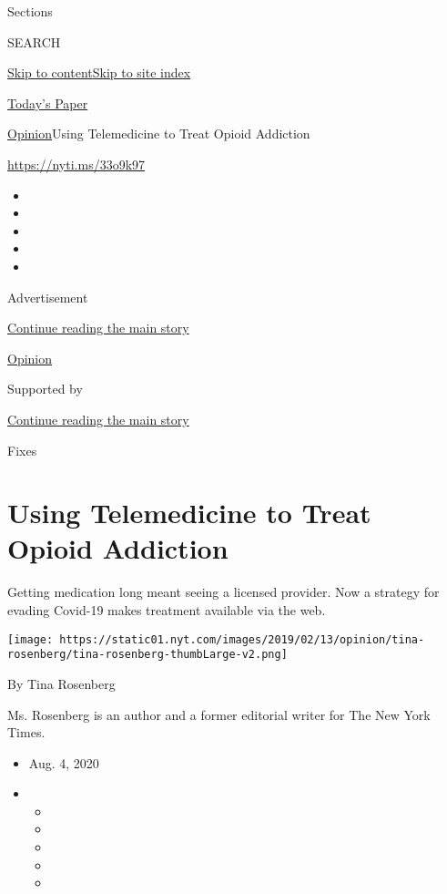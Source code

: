 Sections

SEARCH

\protect\hyperlink{site-content}{Skip to
content}\protect\hyperlink{site-index}{Skip to site index}

\href{https://myaccount.nytimes.com/auth/login?response_type=cookie\&client_id=vi}{}

\href{https://www.nytimes.com/section/todayspaper}{Today's Paper}

\href{/section/opinion}{Opinion}\textbar{}Using Telemedicine to Treat
Opioid Addiction

\url{https://nyti.ms/33o9k97}

\begin{itemize}
\item
\item
\item
\item
\item
\end{itemize}

Advertisement

\protect\hyperlink{after-top}{Continue reading the main story}

\href{/section/opinion}{Opinion}

Supported by

\protect\hyperlink{after-sponsor}{Continue reading the main story}

Fixes

\hypertarget{using-telemedicine-to-treat-opioid-addiction}{%
\section{Using Telemedicine to Treat Opioid
Addiction}\label{using-telemedicine-to-treat-opioid-addiction}}

Getting medication long meant seeing a licensed provider. Now a strategy
for evading Covid-19 makes treatment available via the web.

\texttt{[image: https://static01.nyt.com/images/2019/02/13/opinion/tina-rosenberg/tina-rosenberg-thumbLarge-v2.png]}

By Tina Rosenberg

Ms. Rosenberg is an author and a former editorial writer for The New
York Times.

\begin{itemize}
\item
  Aug. 4, 2020
\item
  \begin{itemize}
  \item
  \item
  \item
  \item
  \item
  \end{itemize}
\end{itemize}


